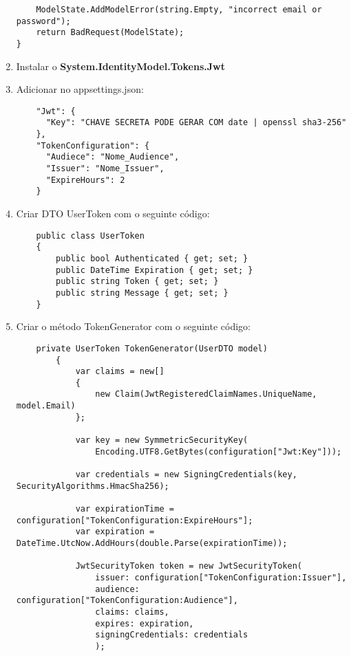 \documentclass{article}
\begin{document}
\begin{enumerate}
\begin{verbatim}
    ModelState.AddModelError(string.Empty, "incorrect email or password");
    return BadRequest(ModelState);
}
    \end{verbatim}
    
    \item Instalar o \textbf{System.IdentityModel.Tokens.Jwt}
    
    \item Adicionar no appsettings.json:
    
    \begin{verbatim}
    "Jwt": {
      "Key": "CHAVE SECRETA PODE GERAR COM date | openssl sha3-256"
    },
    "TokenConfiguration": {
      "Audiece": "Nome_Audience",
      "Issuer": "Nome_Issuer",
      "ExpireHours": 2
    }
    \end{verbatim}
    
    \item Criar DTO UserToken com o seguinte código:
    \begin{verbatim}
    public class UserToken
    {
        public bool Authenticated { get; set; }
        public DateTime Expiration { get; set; }
        public string Token { get; set; }
        public string Message { get; set; }
    }
    \end{verbatim}
    
    \item Criar o método TokenGenerator com o seguinte código:
    
    \begin{verbatim}
    private UserToken TokenGenerator(UserDTO model)
        {
            var claims = new[]
            {
                new Claim(JwtRegisteredClaimNames.UniqueName, model.Email)
            };

            var key = new SymmetricSecurityKey(
                Encoding.UTF8.GetBytes(configuration["Jwt:Key"]));

            var credentials = new SigningCredentials(key, SecurityAlgorithms.HmacSha256);

            var expirationTime = configuration["TokenConfiguration:ExpireHours"];
            var expiration = DateTime.UtcNow.AddHours(double.Parse(expirationTime));

            JwtSecurityToken token = new JwtSecurityToken(
                issuer: configuration["TokenConfiguration:Issuer"],
                audience: configuration["TokenConfiguration:Audience"],
                claims: claims,
                expires: expiration,
                signingCredentials: credentials
                );


\end{verbatim}
\end{enumerate}
\end{document}
